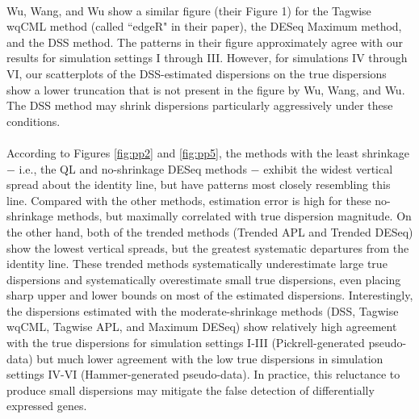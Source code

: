 \documentclass[10pt]{article}
\begin{document}
{ \paragraph{} \indent Wu, Wang, and Wu \cite{dss} show a similar figure (their Figure 1) for the Tagwise wqCML method (called ``edgeR" in their paper), the DESeq Maximum method, and the DSS method. The patterns in their figure approximately agree with our results for simulation settings I through III. However, for simulations IV through VI, our scatterplots of the DSS-estimated dispersions on the true dispersions show a lower truncation that is not present in the figure by Wu, Wang, and Wu. The DSS method may shrink dispersions particularly aggressively under these conditions. }



\paragraph{} \indent According to Figures \ref{fig:pp2} and \ref{fig:pp5}, the methods with the least shrinkage $-$ i.e., the QL and no-shrinkage DESeq methods $-$ exhibit the widest vertical spread about the identity line, but have patterns most closely resembling this line. Compared with the other methods, estimation error is high for these no-shrinkage methods, but maximally correlated with true dispersion magnitude. On the other hand, both of the trended methods (Trended APL and Trended DESeq) show the lowest vertical spreads, but the greatest systematic departures from the identity line. These trended methods systematically underestimate large true dispersions and systematically overestimate small true dispersions, even placing sharp upper and lower bounds on most of the estimated dispersions. %
 Interestingly, the dispersions estimated with the moderate-shrinkage methods (DSS, Tagwise wqCML, Tagwise APL, and Maximum DESeq) show relatively high agreement with the true dispersions for simulation settings I-III (Pickrell-generated pseudo-data) but much lower agreement with the low true dispersions in simulation settings IV-VI (Hammer-generated pseudo-data). In practice, this reluctance to produce small dispersions may mitigate the false detection of differentially expressed genes.
\end{document}
